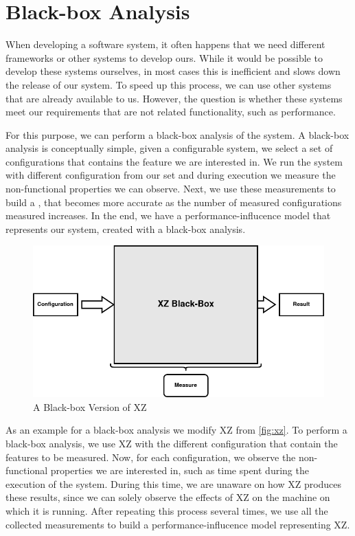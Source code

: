 \section{Black-box Analysis}\label{ch:Blackbox}
When developing a software system, it often happens that we need different frameworks or other systems to develop ours.
While it would be possible to develop these systems ourselves, in most cases this is inefficient and slows down the release of our system.
To speed up this process, we can use other systems that are already available to us. However, the question is whether these systems 
meet our requirements that are not related functionality, such as performance. 

For this purpose, we can perform a black-box analysis of the system. 
A black-box analysis is conceptually simple, given a configurable system, we select a set of configurations that contains the feature we are interested in. 
We run the system with different configuration from our set and during execution we measure the non-functional properties we can observe.
Next, we use these measurements to build a \perfInfluenceModel, that becomes more accurate as the number of measured configurations measured increases.
In the end, we have a performance-influcence model that represents our system, created with a black-box analysis.

\begin{figure}[h]
    \centering
    \includegraphics[scale=0.6]{gfx/BlackBoxXZ.png}
    \caption{A Black-box Version of XZ}
    \label{fig:BBxz}
\end{figure}

As an example for a black-box analysis we modify XZ from \autoref{fig:xz}. To perform a black-box analysis, we use XZ with the different configuration that
contain the features to be measured. Now, for each configuration, we observe the non-functional properties we are interested in, such as time spent during the 
execution of the system. During this time, we are unaware on how XZ produces these results, since we can solely observe the effects of XZ  
on the machine on which it is running.
After repeating this process several times, we use all the collected measurements to build a performance-influcence model representing XZ. 

